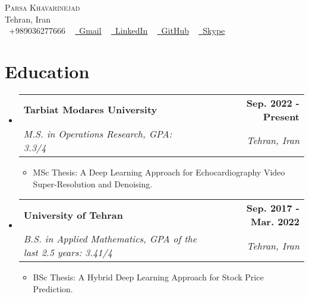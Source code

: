 \documentclass[letterpaper,11pt]{article}
\makeatletter
\newcommand{\resumeItem}[1]{
  \item\small{
    {#1 \vspace{-2pt}}
  }
}
\newcommand{\resumeSubheading}[4]{
  \vspace{-2pt}\item
    \begin{tabular*}{1.0\textwidth}[t]{l@{\extracolsep{\fill}}r}
      \textbf{#1} & \textbf{\small #2} \\
      \textit{\small#3} & \textit{\small #4} \\
    \end{tabular*}\vspace{-7pt}
}
\newcommand{\resumeSubHeadingListStart}{\begin{itemize}[leftmargin=0.0in, label={}]}
\newcommand{\resumeSubHeadingListEnd}{\end{itemize}}
\newcommand{\resumeItemListStart}{\begin{itemize}}
\newcommand{\resumeItemListEnd}{\end{itemize}\vspace{-5pt}}
\makeatother
\begin{document}

\begin{center}
    {\Huge \scshape Parsa Khavarinejad} \\ \vspace{1pt}
    Tehran, Iran \\ \vspace{1pt}
    \small \raisebox{-0.1\height}{\faPhone}\ +989036277666 ~ \href{mailto:parsa.khavarinejad@gmail.com}{\raisebox{-0.2\height}{\faEnvelope}\  \underline{Gmail}} ~ 
    \href{https://linkedin.com/in/parsa-khavarinejad}{\raisebox{-0.2\height}{\faLinkedin}\ \underline{LinkedIn}}  ~
    \href{https://github.com/parsakhavarinejad}{\raisebox{-0.2\height}{\faGithub}\ \underline{GitHub}} ~ \href{https://join.skype.com/invite/elXkdnvbtiRW}{\raisebox{-0.2\height}{\faSkype}\ \underline{Skype}}
    \vspace{-8pt}
\end{center}


\section{Education}
  \resumeSubHeadingListStart
    \resumeSubheading
      {Tarbiat Modares University}{Sep. 2022 - Present}
      {M.S. in Operations Research, GPA: 3.3/4}{Tehran, Iran}
      \resumeItemListStart
        \resumeItem{MSc Thesis: A Deep Learning Approach for Echocardiography Video Super-Resolution and Denoising.}
      \resumeItemListEnd

    \resumeSubheading
      {University of Tehran}{Sep. 2017 - Mar. 2022}
      {B.S. in Applied Mathematics, GPA of the last 2.5 years: 3.41/4}{Tehran, Iran}
      \resumeItemListStart
        \resumeItem{BSc Thesis: A Hybrid Deep Learning Approach for Stock Price Prediction.}
    \resumeItemListEnd
  \resumeSubHeadingListEnd
\vspace{-15pt}
\end{document}
